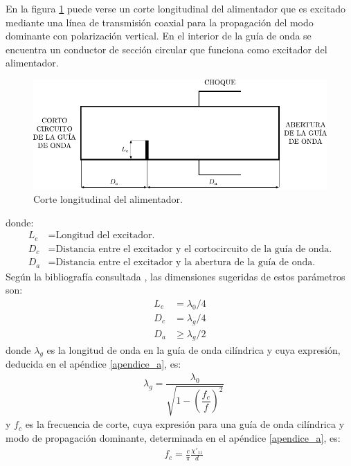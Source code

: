 En la figura \ref{fig_estudio:59} puede verse un corte longitudinal del alimentador que es excitado mediante una línea de transmisión coaxial para la propagación del modo dominante con polarización vertical. En el interior de la guía de onda se encuentra un conductor de sección circular que funciona como excitador del alimentador.
\begin{figure}[H]
\centering
\includegraphics[scale = 1]{Figures/Estudio/estudio_59}
\caption{Corte longitudinal del alimentador.}
\label{fig_estudio:59}
\end{figure}
donde:
\begin{align*}
L_e &= \text{Longitud del excitador.}\\
D_c &= \text{Distancia entre el excitador y el cortocircuito de la guía de onda.}\\
D_a &= \text{Distancia entre el excitador y la abertura de la guía de onda.}
\end{align*}
Según la bibliografía consultada \cite{ARRL} \cite{Carr}, las dimensiones sugeridas de estos parámetros son:
\begin{align*}
L_e &= \lambda_0/4\\
D_c &= \lambda_g/4\\
D_a &\geq \lambda_g/2
\end{align*}
donde $\lambda_g$ es la longitud de onda en la guía de onda cilíndrica y cuya expresión, deducida en el apéndice \ref{apendice_a}, es:
\begin{align}
&\lambda_g = \dfrac{\lambda_0}{\sqrt{1 - \left(\dfrac{f_c}{f}\right)^2}}
\label{ec_estudio:7}
\end{align}
y $f_c$ es la frecuencia de corte, cuya expresión para una guía de onda cilíndrica y modo de propagación dominante, determinada en el apéndice \ref{apendice_a}, es:
\begin{align}
&f_c = \frac{c}{\pi}\frac{\chi '_{11}}{d}
\label{ec_estudio:8}
\end{align}

